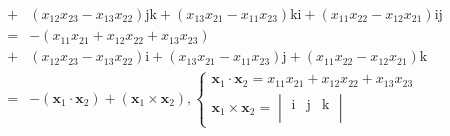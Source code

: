 \documentclass[
]{book}
\theoremstyle{definition}
\theoremstyle{definition}
\theoremstyle{definition}
\theoremstyle{definition}
\theoremstyle{remark}
\begin{document}
\[\begin{aligned}
+ & \left(x_{{\scriptscriptstyle 1}{\scriptscriptstyle 2}}x_{{\scriptscriptstyle 2}{\scriptscriptstyle 3}}-x_{{\scriptscriptstyle 1}{\scriptscriptstyle 3}}x_{{\scriptscriptstyle 2}{\scriptscriptstyle 2}}\right)\mathrm{j}\mathrm{k}+\left(x_{{\scriptscriptstyle 1}{\scriptscriptstyle 3}}x_{{\scriptscriptstyle 2}{\scriptscriptstyle 1}}-x_{{\scriptscriptstyle 1}{\scriptscriptstyle 1}}x_{{\scriptscriptstyle 2}{\scriptscriptstyle 3}}\right)\mathrm{k}\mathrm{i}+\left(x_{{\scriptscriptstyle 1}{\scriptscriptstyle 1}}x_{{\scriptscriptstyle 2}{\scriptscriptstyle 2}}-x_{{\scriptscriptstyle 1}{\scriptscriptstyle 2}}x_{{\scriptscriptstyle 2}{\scriptscriptstyle 1}}\right)\mathrm{i}\mathrm{j}\\
= & -\left(x_{{\scriptscriptstyle 1}{\scriptscriptstyle 1}}x_{{\scriptscriptstyle 2}{\scriptscriptstyle 1}}+x_{{\scriptscriptstyle 1}{\scriptscriptstyle 2}}x_{{\scriptscriptstyle 2}{\scriptscriptstyle 2}}+x_{{\scriptscriptstyle 1}{\scriptscriptstyle 3}}x_{{\scriptscriptstyle 2}{\scriptscriptstyle 3}}\right)\\
+ & \left(x_{{\scriptscriptstyle 1}{\scriptscriptstyle 2}}x_{{\scriptscriptstyle 2}{\scriptscriptstyle 3}}-x_{{\scriptscriptstyle 1}{\scriptscriptstyle 3}}x_{{\scriptscriptstyle 2}{\scriptscriptstyle 2}}\right)\mathrm{i}+\left(x_{{\scriptscriptstyle 1}{\scriptscriptstyle 3}}x_{{\scriptscriptstyle 2}{\scriptscriptstyle 1}}-x_{{\scriptscriptstyle 1}{\scriptscriptstyle 1}}x_{{\scriptscriptstyle 2}{\scriptscriptstyle 3}}\right)\mathrm{j}+\left(x_{{\scriptscriptstyle 1}{\scriptscriptstyle 1}}x_{{\scriptscriptstyle 2}{\scriptscriptstyle 2}}-x_{{\scriptscriptstyle 1}{\scriptscriptstyle 2}}x_{{\scriptscriptstyle 2}{\scriptscriptstyle 1}}\right)\mathrm{k}\\
= & -\left(\boldsymbol{x}_{{\scriptscriptstyle 1}}\cdot\boldsymbol{x}_{{\scriptscriptstyle 2}}\right)+\left(\boldsymbol{x}_{{\scriptscriptstyle 1}}\times\boldsymbol{x}_{{\scriptscriptstyle 2}}\right),\begin{cases}
\boldsymbol{x}_{{\scriptscriptstyle 1}}\cdot\boldsymbol{x}_{{\scriptscriptstyle 2}}=x_{{\scriptscriptstyle 1}{\scriptscriptstyle 1}}x_{{\scriptscriptstyle 2}{\scriptscriptstyle 1}}+x_{{\scriptscriptstyle 1}{\scriptscriptstyle 2}}x_{{\scriptscriptstyle 2}{\scriptscriptstyle 2}}+x_{{\scriptscriptstyle 1}{\scriptscriptstyle 3}}x_{{\scriptscriptstyle 2}{\scriptscriptstyle 3}}\\
\boldsymbol{x}_{{\scriptscriptstyle 1}}\times\boldsymbol{x}_{{\scriptscriptstyle 2}}=\begin{vmatrix}\mathrm{i} & \mathrm{j} & \mathrm{k}\\

\end{vmatrix}
\end{cases}
\end{aligned}\]
\end{document}
